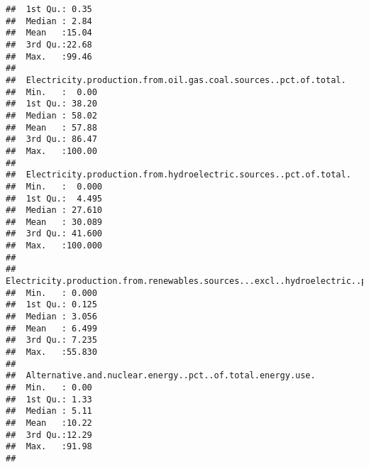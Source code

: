 \documentclass[]{article}
\begin{document}
\begin{verbatim}
##  1st Qu.: 0.35                                          
##  Median : 2.84                                          
##  Mean   :15.04                                          
##  3rd Qu.:22.68                                          
##  Max.   :99.46                                          
##                                                         
##  Electricity.production.from.oil.gas.coal.sources..pct.of.total.
##  Min.   :  0.00                                                 
##  1st Qu.: 38.20                                                 
##  Median : 58.02                                                 
##  Mean   : 57.88                                                 
##  3rd Qu.: 86.47                                                 
##  Max.   :100.00                                                 
##                                                                 
##  Electricity.production.from.hydroelectric.sources..pct.of.total.
##  Min.   :  0.000                                                 
##  1st Qu.:  4.495                                                 
##  Median : 27.610                                                 
##  Mean   : 30.089                                                 
##  3rd Qu.: 41.600                                                 
##  Max.   :100.000                                                 
##                                                                  
##  Electricity.production.from.renewables.sources...excl..hydroelectric..pct.of.total.
##  Min.   : 0.000                                                                     
##  1st Qu.: 0.125                                                                     
##  Median : 3.056                                                                     
##  Mean   : 6.499                                                                     
##  3rd Qu.: 7.235                                                                     
##  Max.   :55.830                                                                     
##                                                                                     
##  Alternative.and.nuclear.energy..pct..of.total.energy.use.
##  Min.   : 0.00                                            
##  1st Qu.: 1.33                                            
##  Median : 5.11                                            
##  Mean   :10.22                                            
##  3rd Qu.:12.29                                            
##  Max.   :91.98                                            
##                                                           

\end{verbatim}
\end{document}

